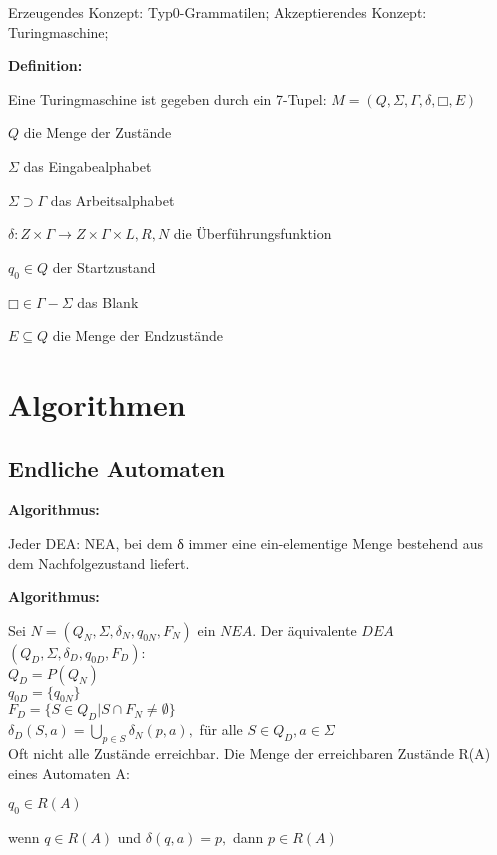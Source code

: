 \documentclass[11pt,
			a4paper,
			parskip=full,
			toc=bib,
			toc=idx,
			toc=listof,
			ngerman
			listof=totoc,]{scrartcl}
\newcommand{\concept}[1]{%
	\sf{%
		\textbf{%
				\textcolor{mymauve}{#1}%
		}%
	}%
	\rm%
}
\newenvironment{objDef}[1]%
{	\begin{framed}
	\textbf{Definition:} \concept{#1}
	\compress}%
{\end{framed}}
\newenvironment{algo}[1]%
{	\begin{framed}
	\textbf{Algorithmus:} \concept{#1}}%
{\end{framed}}
\newcommand{\compress}{\vspace{-1em}}
\begin{document}
\compress
Erzeugendes Konzept: Typ0-Grammatilen; Akzeptierendes Konzept: Turingmaschine; \\
\compress
\begin{objDef}{Turingmaschine}

Eine Turingmaschine ist gegeben durch ein 7-Tupel: $M=(Q,Σ,Γ,δ,□,E)$ \\ 
\compress
\compress
\begin{compactitem}
  \item $Q$ die Menge der Zustände 
  \item $Σ$ das Eingabealphabet
  \item $Σ⊃Γ$ das Arbeitsalphabet
  \item $δ: Z \times Γ → Z \times Γ \times {L,R,N}$ die Überführungsfunktion
  \item $q_0 \in Q$ der Startzustand
  \item $□ \in Γ - Σ$ das Blank
  \item $E ⊆ Q$ die Menge der Endzustände 
\end{compactitem} 
\end{objDef}


\newpage
\section{Algorithmen}
\compress
\subsection{Endliche Automaten}
\begin{algo}{DEA → NEA}

\compress
Jeder DEA: NEA, bei dem δ immer eine ein-elementige Menge bestehend aus dem Nachfolgezustand liefert. 
\end{algo}

\compress
\compress
\begin{algo}{NEA → DEA (Potenzmengenkonstruktion)}

\compress
Sei $N = (Q_N,Σ,δ_N,q_{0N},F_N)$ ein $NEA$. Der äquivalente $DEA$ $(Q_D,Σ,δ_D,q_{0D},F_D)$:\\
$Q_D = P(Q_N)$ \\
$q_{0D} = \{q_{0N}\}$ \\
$F_D = \{ S ∈ Q_D | S ∩ F_N ≠ ∅ \}$ \\
$δ_D(S,a) = \bigcup\limits_{p \in S} δ_N(p,a),$ für alle $S \in Q_D, a \in Σ $\\
Oft nicht alle Zustände erreichbar. Die Menge der erreichbaren Zustände R(A) eines Automaten A:
\compress
\begin{compactitem}
  \item $q_0 \in R(A) $
  \item wenn $q \in R(A)$ und $δ(q,a) = p,$ dann $p \in R(A)$ 
\end{compactitem}
\end{algo}
\end{document}
